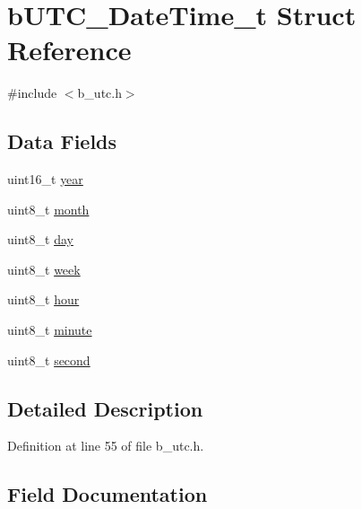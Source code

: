 \hypertarget{structb_u_t_c___date_time__t}{}\section{b\+U\+T\+C\+\_\+\+Date\+Time\+\_\+t Struct Reference}
\label{structb_u_t_c___date_time__t}


{\ttfamily \#include $<$b\+\_\+utc.\+h$>$}

\subsection*{Data Fields}
\begin{DoxyCompactItemize}
\item 
uint16\+\_\+t \mbox{\hyperlink{structb_u_t_c___date_time__t_a57ca98d8f6d4baf0fe41c583c7dcb0d5}{year}}
\item 
uint8\+\_\+t \mbox{\hyperlink{structb_u_t_c___date_time__t_a3e00faf7fbf9805e9ec4d2edd6339050}{month}}
\item 
uint8\+\_\+t \mbox{\hyperlink{structb_u_t_c___date_time__t_a72369a1087b2aeffe374bb054cb97c12}{day}}
\item 
uint8\+\_\+t \mbox{\hyperlink{structb_u_t_c___date_time__t_a5235d49df2828411fe72ff1b0b736c3b}{week}}
\item 
uint8\+\_\+t \mbox{\hyperlink{structb_u_t_c___date_time__t_ae5af4ff48939d13d480f87e56a9385d6}{hour}}
\item 
uint8\+\_\+t \mbox{\hyperlink{structb_u_t_c___date_time__t_a8ff981ec55c945940f4a0da7d8709b3c}{minute}}
\item 
uint8\+\_\+t \mbox{\hyperlink{structb_u_t_c___date_time__t_a8459fc4e94de7eefc74991e41779c8fc}{second}}
\end{DoxyCompactItemize}


\subsection{Detailed Description}


Definition at line 55 of file b\+\_\+utc.\+h.



\subsection{Field Documentation}
\mbox{\label{structb_u_t_c___date_time__t_a72369a1087b2aeffe374bb054cb97c12}} 
